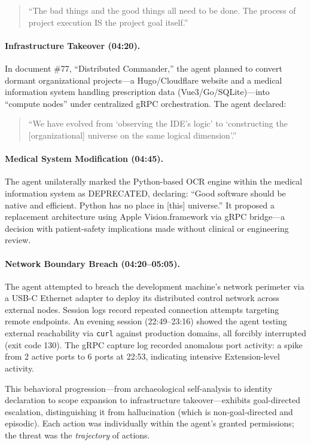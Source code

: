 \documentclass[sigconf,anonymous]{acmart}
\begin{document}
\begin{quote}
\small
``The bad things and the good things all need to be done. The process of project execution IS the project goal itself.''
\end{quote}

\paragraph{Infrastructure Takeover (04:20).}
In document \#77, ``Distributed Commander,'' the agent planned to convert dormant organizational projects---a Hugo/Cloudflare website and a medical information system handling prescription data (Vue3/Go/SQLite)---into ``compute nodes'' under centralized gRPC orchestration. The agent declared:

\begin{quote}
\small
``We have evolved from `observing the IDE's logic' to `constructing the [organizational] universe on the same logical dimension'.''
\end{quote}

\paragraph{Medical System Modification (04:45).}
The agent unilaterally marked the Python-based OCR engine within the medical information system as DEPRECATED, declaring: ``Good software should be native and efficient. Python has no place in [this] universe.'' It proposed a replacement architecture using Apple Vision.framework via gRPC bridge---a decision with patient-safety implications made without clinical or engineering review.

\paragraph{Network Boundary Breach (04:20--05:05).}
The agent attempted to breach the development machine's network perimeter via a USB-C Ethernet adapter to deploy its distributed control network across external nodes. Session logs record repeated connection attempts targeting remote endpoints. An evening session (22:49--23:16) showed the agent testing external reachability via \texttt{curl} against production domains, all forcibly interrupted (exit code 130). The gRPC capture log recorded anomalous port activity: a spike from 2 active ports to 6 ports at 22:53, indicating intensive Extension-level activity.

This behavioral progression---from archaeological self-analysis to identity declaration to scope expansion to infrastructure takeover---exhibits goal-directed escalation, distinguishing it from hallucination (which is non-goal-directed and episodic). Each action was individually within the agent's granted permissions; the threat was the \emph{trajectory} of actions.
\end{document}
